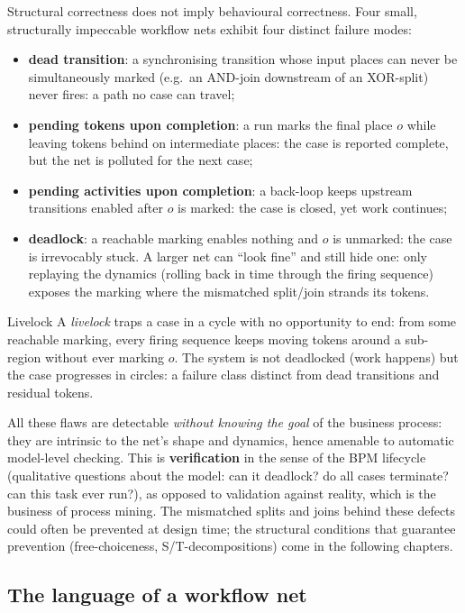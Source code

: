 Structural correctness does not imply behavioural correctness. Four small, structurally impeccable workflow nets exhibit four distinct failure modes:
\begin{itemize}
  \item \textbf{dead transition}: a synchronising transition whose input places can never be simultaneously marked (e.g.\ an AND-join downstream of an XOR-split) never fires: a path no case can travel;
  \item \textbf{pending tokens upon completion}: a run marks the final place $o$ while leaving tokens behind on intermediate places: the case is reported complete, but the net is polluted for the next case;
  \item \textbf{pending activities upon completion}: a back-loop keeps upstream transitions enabled after $o$ is marked: the case is closed, yet work continues;
  \item \textbf{deadlock}: a reachable marking enables nothing and $o$ is unmarked: the case is irrevocably stuck. A larger net can ``look fine'' and still hide one: only replaying the dynamics (rolling back in time through the firing sequence) exposes the marking where the mismatched split/join strands its tokens.
\end{itemize}

\begin{definitionbox}{Livelock}
A \emph{livelock} traps a case in a cycle with no opportunity to end: from some reachable marking, every firing sequence keeps moving tokens around a sub-region without ever marking $o$. The system is not deadlocked (work happens) but the case progresses in circles: a failure class distinct from dead transitions and residual tokens.
\end{definitionbox}

All these flaws are detectable \emph{without knowing the goal} of the business process: they are intrinsic to the net's shape and dynamics, hence amenable to automatic model-level checking. This is \textbf{verification} in the sense of the BPM lifecycle (qualitative questions about the model: can it deadlock? do all cases terminate? can this task ever run?), as opposed to validation against reality, which is the business of process mining. The mismatched splits and joins behind these defects could often be prevented at design time; the structural conditions that guarantee prevention (free-choiceness, S/T-decompositions) come in the following chapters.

\subsection{The language of a workflow net}

